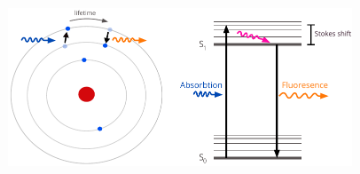 \documentclass[final]{jyflluk}
\begin{document}
\begin{figure}[h]
    \begin{subfigure}[t]{1.0\textwidth}
        \centering
            \includegraphics[width=\linewidth]{images/atomm.pdf} 
            \caption{} \label{fig:atom}
        \end{subfigure}
    

\end{figure}
\end{document}
